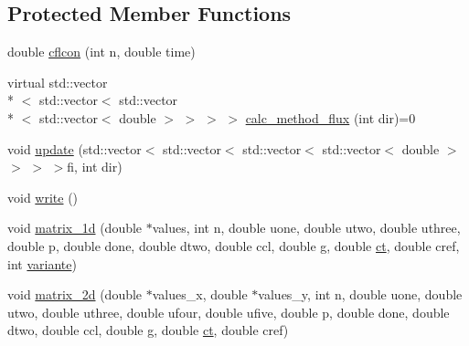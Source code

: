 \subsection*{Protected Member Functions}
\begin{DoxyCompactItemize}
\item 
double \hyperlink{classnumerische__methode_ab6fbf44af8c83d66710ec2f500c121aa}{cflcon} (int n, double time)
\item 
virtual std\-::vector\\*
$<$ std\-::vector$<$ std\-::vector\\*
$<$ std\-::vector$<$ double $>$ $>$ $>$ $>$ \hyperlink{classnumerische__methode_af40ea9c1bfbc9d480e7e0d188f2eccf8}{calc\-\_\-method\-\_\-flux} (int dir)=0
\item 
void \hyperlink{classnumerische__methode_a46867c6648593607c3c596a3eb34402b}{update} (std\-::vector$<$ std\-::vector$<$ std\-::vector$<$ std\-::vector$<$ double $>$ $>$ $>$ $>$fi, int dir)
\item 
void \hyperlink{classnumerische__methode_a25747305213c9a3a54fbc2f1ca5c0113}{write} ()
\item 
void \hyperlink{classnumerische__methode_a0730ea8b5f2561d5bd2474ea0a34a531}{matrix\-\_\-1d} (double $\ast$values, int n, double uone, double utwo, double uthree, double p, double done, double dtwo, double ccl, double \hyperlink{classnumerische__methode_a8adb2a525c7877c531fa960ee5f0176b}{g}, double \hyperlink{classnumerische__methode_aec540b2a47bbc7318f511583087c5498}{ct}, double cref, int \hyperlink{classnumerische__methode_a98b4b3256bbcd2306acbe4d69f5258f7}{variante})
\item 
void \hyperlink{classnumerische__methode_a1ed1a084c11e18bb8fc3beadc2a793e7}{matrix\-\_\-2d} (double $\ast$values\-\_\-x, double $\ast$values\-\_\-y, int n, double uone, double utwo, double uthree, double ufour, double ufive, double p, double done, double dtwo, double ccl, double \hyperlink{classnumerische__methode_a8adb2a525c7877c531fa960ee5f0176b}{g}, double \hyperlink{classnumerische__methode_aec540b2a47bbc7318f511583087c5498}{ct}, double cref)
\end{DoxyCompactItemize}
